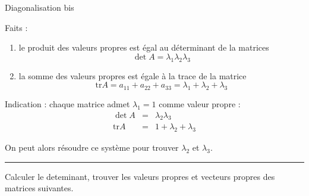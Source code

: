\documentclass{article}
\begin{document}
\begin{center}
{\Large Diagonalisation bis}
\end{center}


\noindent
Faits :
\begin{enumerate}
	\item le produit des valeurs propres est \'egal au
		d\'eterminant de la matrices 
		$$\det A = \lambda_1 \lambda_2 \lambda_3$$
	\item la somme des valeurs propres est \'egale à la
		trace de la matrice 
		$$\mathrm{tr} A = a_{11}  + a_{22} + a_{33} = \lambda_1 + \lambda_2 + \lambda_3
		$$

\end{enumerate}


\noindent
Indication : chaque matrice admet $\lambda_1 = 1$ comme valeur propre : 
\begin{eqnarray}
 \det A&=&  \lambda_2 \lambda_3 \\ 
 \mathrm{tr} A &=& 1 + \lambda_2 + \lambda_3
\end{eqnarray}

On peut alors r\'esoudre ce syst\`eme 
pour trouver $\lambda_2$ et $\lambda_3$.

\vspace{1cm}
\hrule
\vspace{1cm}

\vspace{1cm}
\noindent
Calculer le deteminant, trouver les valeurs propres et vecteurs propres des matrices suivantes.
\end{document}
